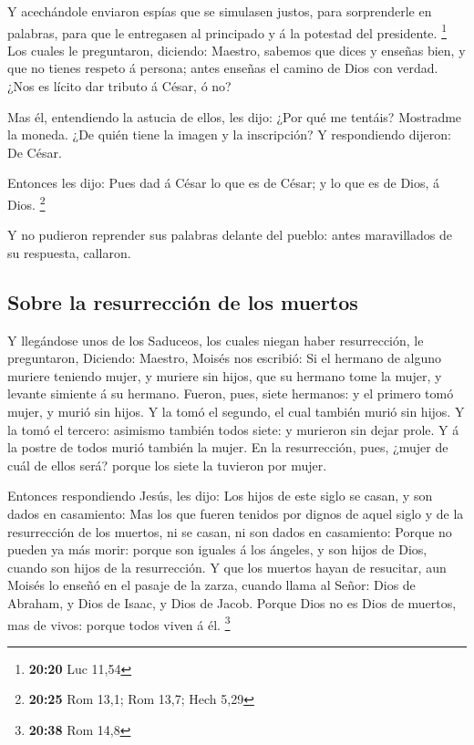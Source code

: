 Y acechándole enviaron espías que se simulasen justos,
para sorprenderle en palabras, para que le entregasen al principado y á
la potestad del presidente. \footnote{\textbf{20:20} Luc 11,54}
 Los cuales le preguntaron, diciendo: Maestro, sabemos
que dices y enseñas bien, y que no tienes respeto á persona; antes
enseñas el camino de Dios con verdad.  ¿Nos es lícito dar
tributo á César, ó no?

 Mas él, entendiendo la astucia de ellos, les dijo: ¿Por
qué me tentáis?  Mostradme la moneda. ¿De quién tiene la
imagen y la inscripción? Y respondiendo dijeron: De César.

 Entonces les dijo: Pues dad á César lo que es de César;
y lo que es de Dios, á Dios. \footnote{\textbf{20:25} Rom 13,1; Rom
  13,7; Hech 5,29}

 Y no pudieron reprender sus palabras delante del pueblo:
antes maravillados de su respuesta, callaron.

\hypertarget{sobre-la-resurrecciuxf3n-de-los-muertos}{%
\subsection{Sobre la resurrección de los
muertos}\label{sobre-la-resurrecciuxf3n-de-los-muertos}}

 Y llegándose unos de los Saduceos, los cuales niegan
haber resurrección, le preguntaron,  Diciendo: Maestro,
Moisés nos escribió: Si el hermano de alguno muriere teniendo mujer, y
muriere sin hijos, que su hermano tome la mujer, y levante simiente á su
hermano.  Fueron, pues, siete hermanos: y el primero tomó
mujer, y murió sin hijos.  Y la tomó el segundo, el cual
también murió sin hijos.  Y la tomó el tercero: asimismo
también todos siete: y murieron sin dejar prole.  Y á la
postre de todos murió también la mujer.  En la
resurrección, pues, ¿mujer de cuál de ellos será? porque los siete la
tuvieron por mujer.

 Entonces respondiendo Jesús, les dijo: Los hijos de este
siglo se casan, y son dados en casamiento:  Mas los que
fueren tenidos por dignos de aquel siglo y de la resurrección de los
muertos, ni se casan, ni son dados en casamiento:  Porque
no pueden ya más morir: porque son iguales á los ángeles, y son hijos de
Dios, cuando son hijos de la resurrección.  Y que los
muertos hayan de resucitar, aun Moisés lo enseñó en el pasaje de la
zarza, cuando llama al Señor: Dios de Abraham, y Dios de Isaac, y Dios
de Jacob.  Porque Dios no es Dios de muertos, mas de
vivos: porque todos viven á él. \footnote{\textbf{20:38} Rom 14,8}

